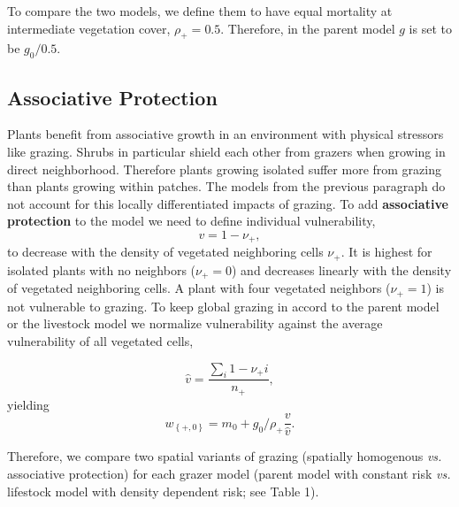 To compare the two models, we define them to have equal mortality at intermediate vegetation cover, $\rho_+ = 0.5$. Therefore, in the parent model $g$ is set to be $g_0/0.5$. 

\subsection{Associative Protection}
Plants benefit from associative growth in an environment with physical stressors like grazing. Shrubs in particular shield each other from grazers when growing in direct neighborhood. Therefore plants growing isolated suffer more from grazing than plants growing within patches.
The models from the previous paragraph do not account for this locally differentiated impacts of grazing. To add \textbf{associative protection} to the model we need to define individual vulnerability, 
\begin{equation}
v = 1 - \nu_+ ,
\end{equation}
to decrease with the density of vegetated neighboring cells $\nu_+$. It is highest for isolated plants with no neighbors ($\nu_+ = 0$) and decreases linearly with the density of vegetated neighboring cells. A plant with four vegetated neighbors ($\nu_+ = 1$) is not vulnerable to grazing. 
To keep global grazing in accord to the parent model or the livestock model we normalize vulnerability against the average vulnerability of all vegetated cells,

\begin{equation}
\widehat{v} =  \frac{ \sum\limits_i{ 1 - {\nu_+i}}  } {n_+} ,
\label{eq:vul}
\end{equation}
yielding
\begin{equation}
	w_{ \left\{ +,0 \right\} }  = m_0 + g_0 / \rho_+ \frac{v}{\widehat{v}}.
\label{eq:}
\end{equation}

Therefore, we compare two spatial variants of grazing (spatially homogenous \textit{vs.} associative protection) for each grazer model (parent model with constant risk \textit{vs.} lifestock model with density dependent risk; see Table 1). 



